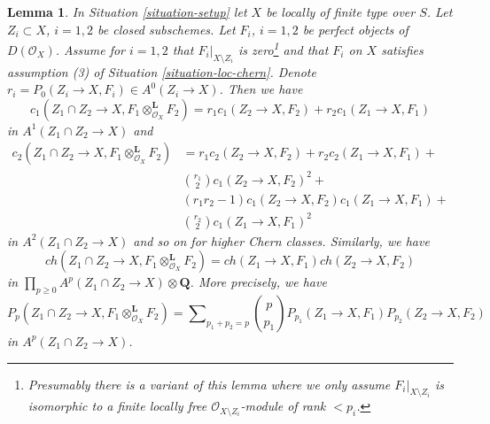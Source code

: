 \documentclass[10pt,a4paper]{amsart}
\theoremstyle{plain}
\newtheorem{lemma}[subsection]{Lemma}
\theoremstyle{definition}
\theoremstyle{remark}
\numberwithin{equation}{subsection}
\begin{document}
\begin{lemma}
\label{lemma-loc-chern-tensor-product}
In Situation \ref{situation-setup} let $X$ be locally of finite type over $S$.
Let $Z_i \subset X$, $i = 1, 2$ be closed subschemes. Let $F_i$, $i = 1, 2$
be perfect objects of $D(\mathcal{O}_X)$. Assume for $i = 1, 2$ that
$F_i|_{X \setminus Z_i}$ is zero\footnote{Presumably there
is a variant of this lemma where we only assume $F_i|_{X \setminus Z_i}$
is isomorphic to a finite locally free $\mathcal{O}_{X \setminus Z_i}$-module
of rank $< p_i$.} and that $F_i$ on $X$ satisfies assumption
(3) of Situation \ref{situation-loc-chern}. Denote
$r_i = P_0(Z_i \to X, F_i) \in A^0(Z_i \to X)$.
Then we have
$$
c_1(Z_1 \cap Z_2 \to X, F_1 \otimes_{\mathcal{O}_X}^\mathbf{L} F_2) =
r_1 c_1(Z_2 \to X, F_2) + r_2 c_1(Z_1 \to X, F_1)
$$
in $A^1(Z_1 \cap Z_2 \to X)$ and
\begin{align*}
c_2(Z_1 \cap Z_2 \to X, F_1 \otimes_{\mathcal{O}_X}^\mathbf{L} F_2)
& =
r_1 c_2(Z_2 \to X, F_2) +
r_2 c_2(Z_1 \to X, F_1) + \\
& {r_1 \choose 2} c_1(Z_2 \to X, F_2)^2 + \\
& (r_1r_2 - 1) c_1(Z_2 \to X, F_2)c_1(Z_1 \to X, F_1) + \\
& {r_2 \choose 2} c_1(Z_1 \to X, F_1)^2
\end{align*}
in $A^2(Z_1 \cap Z_2 \to X)$ and so on for higher Chern classes.
Similarly, we have
$$
ch(Z_1 \cap Z_2 \to X, F_1 \otimes_{\mathcal{O}_X}^\mathbf{L} F_2) =
ch(Z_1 \to X, F_1) ch(Z_2 \to X, F_2)
$$
in $\prod_{p \geq 0} A^p(Z_1 \cap Z_2 \to X) \otimes \mathbf{Q}$.
More precisely, we have
$$
P_p(Z_1 \cap Z_2 \to X, F_1 \otimes_{\mathcal{O}_X}^\mathbf{L} F_2) =
\sum\nolimits_{p_1 + p_2 = p}
{p \choose p_1} P_{p_1}(Z_1 \to X, F_1) P_{p_2}(Z_2 \to X, F_2)
$$
in $A^p(Z_1 \cap Z_2 \to X)$.
\end{lemma}
\end{document}
